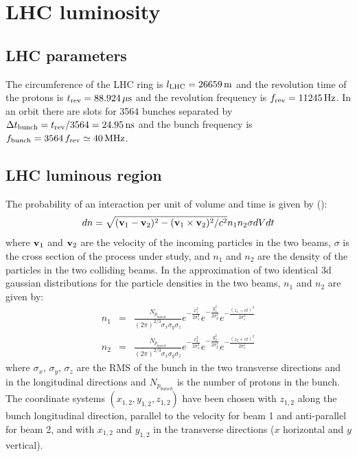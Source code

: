 \documentclass[10pt]{article}
\begin{document}
\section{LHC luminosity}
%
\subsection{LHC parameters}
The circumference of the LHC ring is $l_{\rm LHC}=26659\,{\rm m}$ and the revolution time of the protons is $t_{\rm rev}=88.924\,\mu{\rm s}$ and the revolution frequency is $f_{\rm rev}=11245\,{\rm Hz}$. In an orbit there are slots for 3564 bunches separated by $\Delta t_{\rm bunch} = t_{\rm rev}/3564 = 24.95\,{\rm ns}$ and the bunch frequency is $f_{\rm bunch} = 3564\,f_{\rm rev} \simeq 40\,{\rm MHz}$.
%
\subsection{LHC luminous region}
\label{sec:lr}
The probability of an interaction per unit of volume and time is given by (\cite{bib:LandauFT}):
\begin{equation}
dn = \sqrt{({\bf v}_1-{\bf v}_2)^2-({\bf v}_1\times{\bf v}_2)^2/c^2}n_1n_2\sigma dVdt
\end{equation}
where ${\bf v}_1$ and ${\bf v}_2$ are the velocity of the incoming particles in the two beams, $\sigma$ is the cross section of the process under study, and $n_1$ and $n_2$ are the density of the particles in the two colliding beams.
In the approximation of two identical 3d gaussian distributions for the particle densities in the two beams, $n_1$ and $n_2$ are given by:
\begin{eqnarray}
n_1&=&\frac{N_{p_{bunch}}}{(2\pi)^{2/3}\sigma_x\sigma_y\sigma_z}e^{-\frac{x_1^2}{2\sigma_x^2}}e^{-\frac{y_1^2}{2\sigma_y^2}}e^{-\frac{(z_1-ct)^2}{2\sigma_z^2}} \\
n_2&=&\frac{N_{p_{bunch}}}{(2\pi)^{2/3}\sigma_x\sigma_y\sigma_z}e^{-\frac{x_2^2}{2\sigma_x^2}}e^{-\frac{y_2^2}{2\sigma_y^2}}e^{-\frac{(z_2+ct)^2}{2\sigma_z^2}}
\end{eqnarray}
where $\sigma_x,\,\sigma_y,\,\sigma_z$ are the RMS of the bunch in the two transverse directions and in the longitudinal directions and $N_{p_{bunch}}$ is the number of protons in the bunch. The coordinate systems $(x_{1,2},y_{1,2},z_{1,2})$ have been chosen with $z_{1,2}$ along the bunch longitudinal direction, parallel to the velocity for beam 1 and anti-parallel for beam 2, and with $x_{1,2}$ and $y_{1,2}$ in the transverse directions ($x$ horizontal and $y$ vertical).
\end{document}
